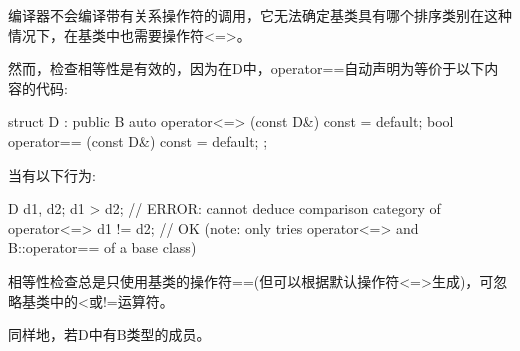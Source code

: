 编译器不会编译带有关系操作符的调用，它无法确定基类具有哪个排序类别在这种情况下，在基类中也需要操作符<=>。

然而，检查相等性是有效的，因为在D中，operator==自动声明为等价于以下内容的代码:

\begin{cpp}
struct D : public B {
	auto operator<=> (const D&) const = default;
	bool operator== (const D&) const = default;
};
\end{cpp}

当有以下行为:

\begin{cpp}
D d1, d2;
d1 > d2; // ERROR: cannot deduce comparison category of operator<=>
d1 != d2; // OK (note: only tries operator<=> and B::operator== of a base class)
\end{cpp}

相等性检查总是只使用基类的操作符==(但可以根据默认操作符<=>生成)，可忽略基类中的<或!=运算符。

同样地，若D中有B类型的成员。
